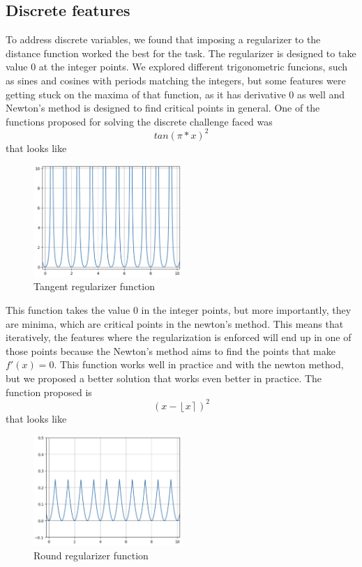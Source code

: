 \documentclass[12pt]{extarticle}
\numberwithin{equation}{section}
\begin{document}
\subsection{Discrete features}\label{sec:discrete}
To address discrete variables, we found that imposing a regularizer to the distance function worked the best for the task. The regularizer is designed 
to take value 0 at the integer points. We explored different trigonometric funcions, such as sines and cosines with periods matching the integers, but some features were getting stuck on the maxima of that function, as it has derivative 0 as well and Newton's method is designed to find critical points in general. One of the functions proposed for solving the discrete challenge faced was
\begin{equation}
    tan(\pi * x)^2
\end{equation}
that looks like
\begin{figure}[H]
    \centering
    \includegraphics[width=0.5\textwidth]{images/tan_integers}
    \caption{Tangent regularizer function}
    \label{fig:reg tan}
\end{figure}
This function takes the value 0 in the integer points, but more importantly, they are minima, which are critical points in the newton's method. This means that iteratively, the features where the regularization is enforced will end up in one of those points because the Newton's method aims to find the points that make $f'(x) = 0$. This function works well in practice and with the newton method, but we proposed a better solution that works even better in practice. The function proposed is
\begin{equation}
    (x - \left\lfloor x \right\rceil )^2
\end{equation}
that looks like
\begin{figure}[H]
    \centering
    \includegraphics[width=0.5\textwidth]{images/round_integers}
    \caption{Round regularizer function}
    \label{fig:reg round}
\end{figure}
\end{document}
